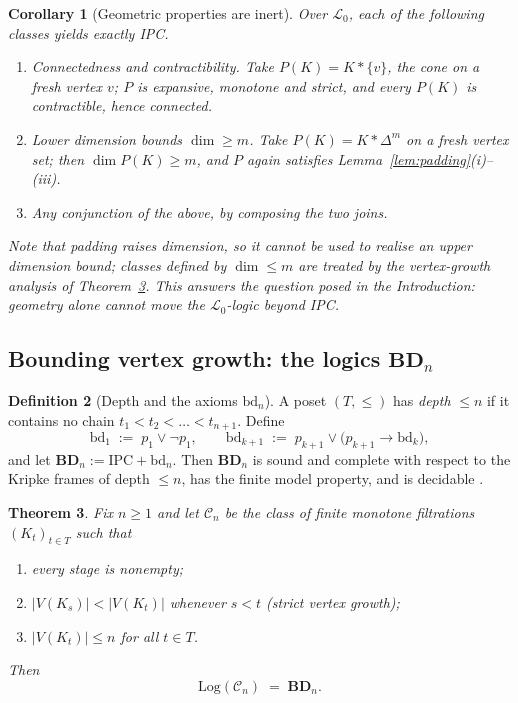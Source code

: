 \documentclass[final,12pt]{elsarticle}
\theoremstyle{plain}
\newtheorem{thm}{Theorem}[section]
\newtheorem{cor}[thm]{Corollary}
\theoremstyle{definition}
\newtheorem{defi}[thm]{Definition}
\begin{document}
\begin{cor}[Geometric properties are inert]
\label{cor:geometry-list}
Over \(\mathcal{L}_0\), each of the following classes yields exactly IPC.
\begin{enumerate}
  \item \emph{Connectedness and contractibility.}  Take
  \(P(K)=K\ast\{v\}\), the cone on a fresh vertex \(v\); \(P\) is expansive,
  monotone and strict, and every \(P(K)\) is contractible, hence connected.
  \item \emph{Lower dimension bounds \(\dim\ge m\).}  Take
  \(P(K)=K\ast\Delta^{m}\) on a fresh vertex set; then
  \(\dim P(K)\ge m\), and \(P\) again satisfies
  Lemma~\ref{lem:padding}(i)--(iii).
  \item \emph{Any conjunction of the above}, by composing the two joins.
\end{enumerate}
Note that padding raises dimension, so it cannot be used to realise an
\emph{upper} dimension bound; classes defined by \(\dim\le m\) are treated by
the vertex-growth analysis of Theorem~\ref{thm:bdn}.  This answers the question
posed in the Introduction: geometry alone cannot move the
\(\mathcal{L}_0\)-logic beyond IPC.
\end{cor}

\subsection{Bounding vertex growth: the logics \texorpdfstring{$\mathbf{BD}_n$}{BDn}}

\begin{defi}[Depth and the axioms \texorpdfstring{$\mathrm{bd}_n$}{bdn}]
\label{def:bdn}
A poset \((T,\le)\) has \emph{depth} \(\le n\) if it contains no chain
\(t_1<t_2<\dots<t_{n+1}\).  Define
\[
  \mathrm{bd}_1 \;:=\; p_1\vee\neg p_1,
  \qquad
  \mathrm{bd}_{k+1} \;:=\; p_{k+1}\vee\bigl(p_{k+1}\to \mathrm{bd}_k\bigr),
\]
and let \(\mathbf{BD}_n := \mathrm{IPC}+\mathrm{bd}_n\).  Then
\(\mathbf{BD}_n\) is sound and complete with respect to the Kripke frames of
depth \(\le n\), has the finite model property, and is decidable
\cite{chagrovzakharyaschev1997}.
\end{defi}

\begin{thm}
\label{thm:bdn}
Fix \(n\ge 1\) and let \(\mathcal{C}_n\) be the class of finite monotone
filtrations \((K_t)_{t\in T}\) such that
\begin{enumerate}
  \item every stage is nonempty;
  \item \(|V(K_s)|<|V(K_t)|\) whenever \(s<t\) (strict vertex growth);
  \item \(|V(K_t)|\le n\) for all \(t\in T\).
\end{enumerate}
Then
\[
  \mathrm{Log}(\mathcal{C}_n)\;=\;\mathbf{BD}_n .
\]
\end{thm}
\end{document}
